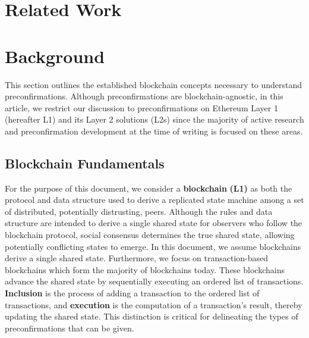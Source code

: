\documentclass[a4paper]{article}
\theoremstyle{boldstyle}
\newcommand{\cm}[1]{\textcolor{blue}{\textbf{Conor:} #1}}
\begin{document}
\section{Related Work}


\section{Background} 
This section outlines the established blockchain concepts necessary to understand preconfirmations. Although preconfirmations are blockchain-agnostic, in this article, we restrict our discussion to preconfirmations on Ethereum Layer 1 (hereafter L1) and its Layer 2 solutions (L2s) since the majority of active research and preconfirmation development at the time of writing is focused on these areas.

    \subsection{Blockchain Fundamentals}
    For the purpose of this document, we consider a \textbf{blockchain} \textbf{(L1)} as both the protocol and data structure used to derive a replicated state machine among a set of distributed, potentially distrusting, peers. Although the rules and data structure are intended to derive a single shared state for observers who follow the blockchain protocol, social consensus determines the true shared state, allowing potentially conflicting states to emerge. In this document, we assume blockchains derive a single shared state. Furthermore, we focus on transaction-based blockchains which form the majority of blockchains today. These blockchains advance the shared state by sequentially executing an ordered list of transactions. \textbf{Inclusion} is the process of adding a transaction to the ordered list of transactions, and \textbf{execution} is the computation of a transaction's result, thereby updating the shared state. This distinction is critical for delineating the types of preconfirmations that can be given.
    
\end{document}
